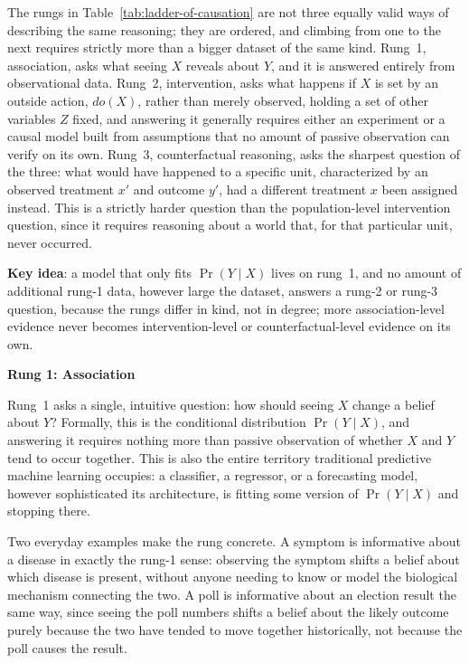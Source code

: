 The rungs in Table~\ref{tab:ladder-of-causation} are not three equally valid ways of describing the same reasoning; they are ordered, and climbing from one to the next requires strictly more than a bigger dataset of the same kind. Rung~1, association, asks what seeing $X$ reveals about $Y$, and it is answered entirely from observational data. Rung~2, intervention, asks what happens if $X$ is set by an outside action, $do(X)$, rather than merely observed, holding a set of other variables $Z$ fixed, and answering it generally requires either an experiment or a causal model built from assumptions that no amount of passive observation can verify on its own. Rung~3, counterfactual reasoning, asks the sharpest question of the three: what would have happened to a specific unit, characterized by an observed treatment $x'$ and outcome $y'$, had a different treatment $x$ been assigned instead. This is a strictly harder question than the population-level intervention question, since it requires reasoning about a world that, for that particular unit, never occurred.

\textbf{Key idea}: a model that only fits $\Pr(Y \mid X)$ lives on rung~1, and no amount of additional rung-1 data, however large the dataset, answers a rung-2 or rung-3 question, because the rungs differ in kind, not in degree; more association-level evidence never becomes intervention-level or counterfactual-level evidence on its own.

\textbf{Rung 1: Association}

Rung~1 asks a single, intuitive question: how should seeing $X$ change a belief about $Y$? Formally, this is the conditional distribution $\Pr(Y \mid X)$, and answering it requires nothing more than passive observation of whether $X$ and $Y$ tend to occur together. This is also the entire territory traditional predictive machine learning occupies: a classifier, a regressor, or a forecasting model, however sophisticated its architecture, is fitting some version of $\Pr(Y \mid X)$ and stopping there.

Two everyday examples make the rung concrete. A symptom is informative about a disease in exactly the rung-1 sense: observing the symptom shifts a belief about which disease is present, without anyone needing to know or model the biological mechanism connecting the two. A poll is informative about an election result the same way, since seeing the poll numbers shifts a belief about the likely outcome purely because the two have tended to move together historically, not because the poll causes the result.

